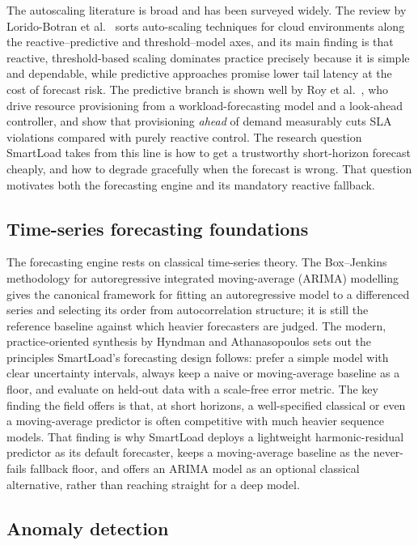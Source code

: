 The autoscaling literature is broad and has been surveyed widely. The review by
Lorido-Botran et al.\ \cite{lorido2014autoscaling} sorts auto-scaling
techniques for cloud environments along the reactive--predictive and
threshold--model axes, and its main finding is that reactive, threshold-based
scaling dominates practice precisely because it is simple and dependable, while
predictive approaches promise lower tail latency at the cost of forecast risk.
The predictive branch is shown well by Roy et al.\ \cite{roy2011autoscaling},
who drive resource provisioning from a workload-forecasting model and a
look-ahead controller, and show that provisioning \emph{ahead} of demand
measurably cuts SLA violations compared with purely reactive control. The
research question SmartLoad takes from this line is how to get a trustworthy
short-horizon forecast cheaply, and how to degrade gracefully when the forecast
is wrong. That question motivates both the forecasting engine and its mandatory
reactive fallback.

\subsection{Time-series forecasting foundations}
\label{lit:sec:research-forecasting}

The forecasting engine rests on classical time-series theory. The Box--Jenkins
methodology for autoregressive integrated moving-average (ARIMA) modelling
\cite{box2015timeseries} gives the canonical framework for fitting an
autoregressive model to a differenced series and selecting its order from
autocorrelation structure; it is still the reference baseline against which
heavier forecasters are judged. The modern, practice-oriented synthesis by
Hyndman and Athanasopoulos \cite{hyndman2021forecasting} sets out the
principles SmartLoad's forecasting design follows: prefer a simple model with
clear uncertainty intervals, always keep a naive or moving-average baseline as
a floor, and evaluate on held-out data with a scale-free error metric. The key
finding the field offers is that, at short horizons, a well-specified classical
or even a moving-average predictor is often competitive with much heavier
sequence models. That finding is why SmartLoad deploys a lightweight
harmonic-residual predictor as its default forecaster, keeps a moving-average
baseline as the never-fails fallback floor, and offers an ARIMA model as an
optional classical alternative, rather than reaching straight for a deep model.

\subsection{Anomaly detection}
\label{lit:sec:research-anomaly}

